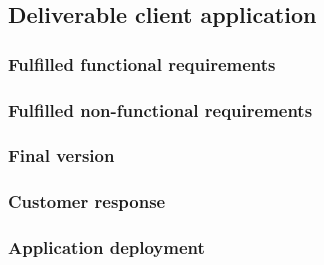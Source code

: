 \subsection{Deliverable client application}
	\subsubsection{Fulfilled functional requirements}
	\subsubsection{Fulfilled non-functional requirements}
	\subsubsection{Final version}
	\subsubsection{Customer response}
	\subsubsection{Application deployment}
	


